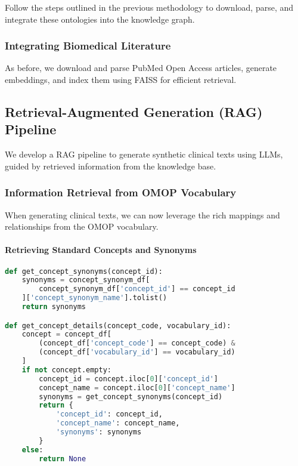 \documentclass[12pt, a4paper]{article}
\begin{document}
Follow the steps outlined in the previous methodology to download, parse, and integrate these ontologies into the knowledge graph.

\subsubsection{Integrating Biomedical Literature}

As before, we download and parse PubMed Open Access articles, generate embeddings, and index them using FAISS for efficient retrieval.

\subsection{Retrieval-Augmented Generation (RAG) Pipeline}

We develop a RAG pipeline to generate synthetic clinical texts using LLMs, guided by retrieved information from the knowledge base.

\subsubsection{Information Retrieval from OMOP Vocabulary}

When generating clinical texts, we can now leverage the rich mappings and relationships from the OMOP vocabulary.

\paragraph{Retrieving Standard Concepts and Synonyms}

\begin{lstlisting}[language=Python]
def get_concept_synonyms(concept_id):
    synonyms = concept_synonym_df[
        concept_synonym_df['concept_id'] == concept_id
    ]['concept_synonym_name'].tolist()
    return synonyms

def get_concept_details(concept_code, vocabulary_id):
    concept = concept_df[
        (concept_df['concept_code'] == concept_code) &
        (concept_df['vocabulary_id'] == vocabulary_id)
    ]
    if not concept.empty:
        concept_id = concept.iloc[0]['concept_id']
        concept_name = concept.iloc[0]['concept_name']
        synonyms = get_concept_synonyms(concept_id)
        return {
            'concept_id': concept_id,
            'concept_name': concept_name,
            'synonyms': synonyms
        }
    else:
        return None
\end{lstlisting}
\end{document}
